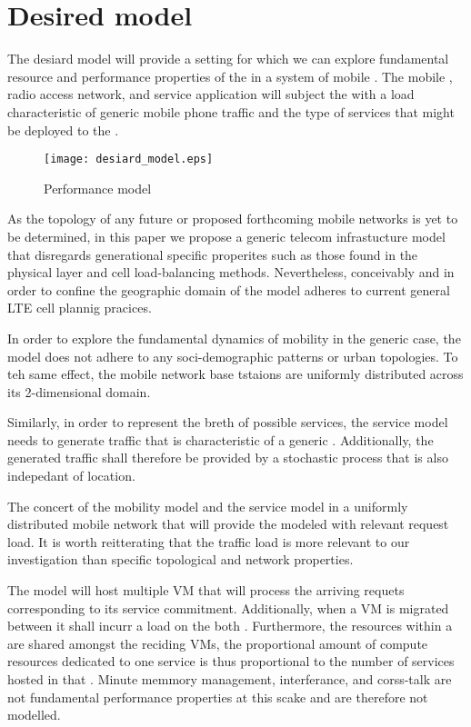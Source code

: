 \section{Desired model}

The desiard model will provide a setting for which we can explore fundamental resource and performance properties of the \xcloud in a system of mobile \ues. The mobile \ues, radio access network, and service application will subject the \dcs with a load characteristic of generic mobile phone traffic and the type of services that might be deployed to the \xcloud.

\begin{figure}[tb]
	\centering
	\texttt{[image: desiard\_model.eps]} 
	\caption{Performance model}
	\label{fig:performance_model}
\end{figure}

As the topology of any future \xcloud or proposed forthcoming mobile networks is yet to be determined, in this paper we propose a generic telecom infrastucture model that disregards generational specific properites such as those found in the physical layer and cell load-balancing methods. Nevertheless, conceivably and in order to confine the geographic domain of the model adheres to current general LTE cell plannig pracices. 

In order to explore the fundamental dynamics of mobility in the generic case, the model does not adhere to any soci-demographic patterns or urban topologies. To teh same effect, the mobile network base tstaions are  uniformly distributed across its 2-dimensional domain.

Similarly, in order to represent the breth of possible services, the service model needs to generate traffic that is characteristic of a generic \ue. Additionally, the generated traffic shall therefore be provided by a stochastic process that is also indepedant of location.

The concert of the mobility model and the service model in a uniformly distributed mobile network that will provide the modeled \dcs with relevant request load. It is worth reitterating that the traffic load is more relevant to our investigation than specific topological and network properties.

The \dc model will host multiple VM that will process the arriving requets corresponding to its service commitment. Additionally, when a VM is migrated between \dcs it shall incurr a load on the both \dcs. Furthermore, the resources within a \dc are shared amongst the reciding VMs, the proportional amount of compute resources dedicated to one service is thus proportional to the number of services hosted in that \dc.  Minute memmory management, interferance, and corss-talk are not fundamental performance properties at this scake and are therefore not modelled.